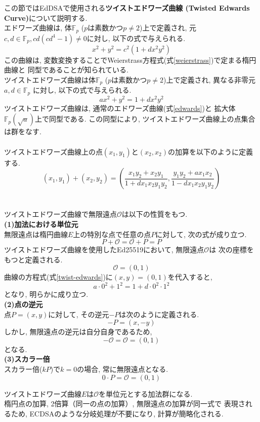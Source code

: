 この節ではEdDSAで使用される\textbf{ツイストエドワーズ曲線
(Twisted Edwards Curve)}について説明する.\\
\indent エドワーズ曲線は, 体$\mathbb{F}_p$ ($p$は素数かつ$p\neq 2$)上で定義され, 
元$c,d\in \mathbb{F}_p, cd(cd^{4}-1)\neq 0$に対し, 
以下の式で与えられる.
\begin{equation}\label{edwards}
  x^2 + y^2 = c^2(1+dx^2y^2)
\end{equation}
この曲線は, 変数変換することでWeierstrass方程式(式\ref{weierstrass})で定まる楕円曲線と
同型であることが知られている\cite{edwarscurve-to-ellipticcurve}.\\
\indent ツイストエドワーズ曲線は体$\mathbb{F}_p$ ($p$は素数かつ$p\neq 2$)上で定義され, 
異なる非零元$a,d\in \mathbb{F}_p$ に対し, 以下の式で与えられる.
\begin{equation}\label{twist-edwards}
  ax^2 + y^2 = 1 + dx^2y^2
\end{equation}
ツイストエドワーズ曲線は, 通常のエドワーズ曲線(式\ref{edwards})と
拡大体$\mathbb{F}_p (\sqrt{a})$上で同型である. この同型により, 
ツイストエドワーズ曲線上の点集合は群をなす\cite{twisted}.\\[1em]
\\
\indent ツイストエドワーズ曲線上の点$(x_1,y_1)$と$(x_2,x_2)$の加算を以下のように定義する.
\[
  (x_1,y_1)+(x_2,y_2)=
  \left( 
    \frac{x_1y_2+x_2y_1}{1+dx_1x_2y_1y_2},
    \frac{y_1y_2+ax_1x_2}{1-dx_1x_2y_1y_2} 
  \right)
\] \\[1em]
\\
\indent ツイストエドワーズ曲線で無限遠点$\mathcal{O}$は以下の性質をもつ.\\[0.5em]
\noindent\textbf{(1)加法における単位元}\\
\indent 無限遠点は楕円曲線$E$上の特別な点で任意の点$P$に対して, 次の式が成り立つ.
\[
  P+\mathcal{O}=\mathcal{O}+P=P
\]
\indent ツイストエドワーズ曲線を使用したEd25519において, 無限遠点$\mathcal{O}$は
次の座標をもつと定義される.
\[
  \mathcal{O}=(0,1)
\]
\indent 曲線の方程式(式\ref{twist-edwards})に$(x,y)=(0,1)$を代入すると,
\[
  a\cdot 0^2 + 1^2 = 1 + d\cdot 0^{2}\cdot 1^2
\]
となり, 明らかに成り立つ.\\[1em]
\noindent \textbf{(2)点の逆元}\\
\indent 点$P=(x,y)$に対して, その逆元$-P$は次のように定義される.
\[
  -P=(x,-y)
\]
\indent しかし, 無限遠点の逆元は自分自身であるため, 
\[
  -\mathcal{O}=\mathcal{O}=(0,1)
\]
となる.\\
\noindent \textbf{(3)スカラー倍}\\
\indent スカラー倍($kP$)で$k=0$の場合, 常に無限遠点となる.
\[
  0\cdot P=\mathcal{O}=(0,1)
\]

\indent ツイストエドワーズ曲線$E$は$\mathcal{O}$を単位元とする加法群になる.\\
楕円点の加算, 2倍算（同一の点の加算）, 無限遠点の加算が同一式で
表現されるため, ECDSAのような分岐処理が不要になり, 計算が簡略化される.\\



